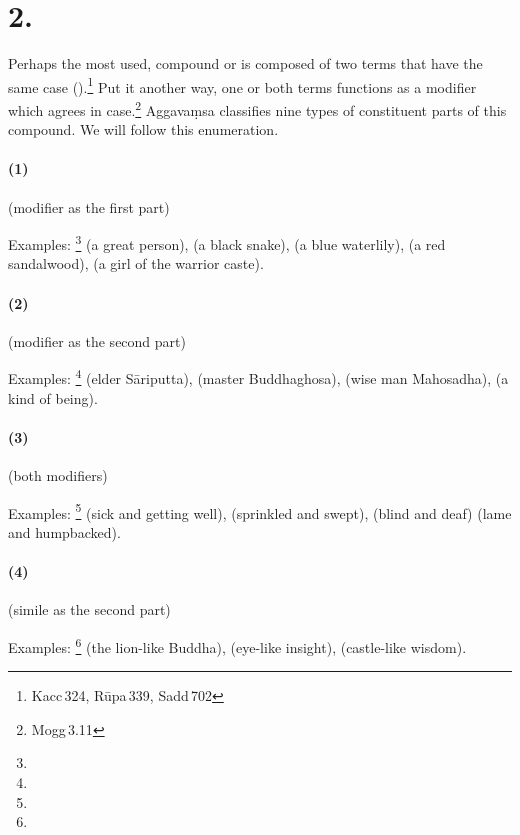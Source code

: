 \section*{2. }\label{sec:kamma}

Perhaps the most used,  compound or  is composed of two terms that have the same case ().\footnote{Kacc\,324, R\=upa\,339, Sadd\,702} Put it another way, one or both terms functions as a modifier which agrees in case.\footnote{Mogg\,3.11} Aggava\d msa classifies nine types of constituent parts of this compound. We will follow this enumeration.

\paragraph*{(1) } (modifier as the first part)\par
Examples: \footnote{} (a great person),  (a black snake),  (a blue waterlily),  (a red sandalwood),  (a girl of the warrior caste).

\paragraph*{(2) } (modifier as the second part)\par
Examples: \footnote{} (elder S\=ariputta),  (master Buddhaghosa),  (wise man Mahosadha),  (a kind of being).

\paragraph*{(3) } (both modifiers)\par
Examples: \footnote{} (sick and getting well),  (sprinkled and swept),  (blind and deaf)  (lame and humpbacked).

\paragraph*{(4) } (simile as the second part)\par
Examples: \footnote{} (the lion-like Buddha),  (eye-like insight),  (castle-like wisdom).

